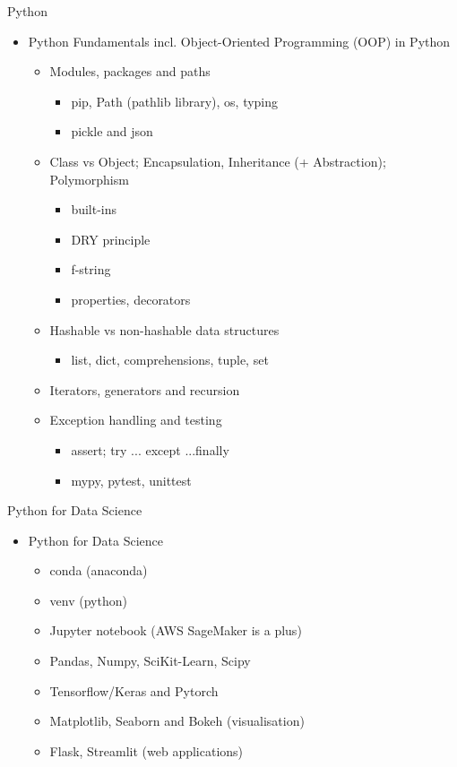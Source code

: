 \documentclass[compress,brown]{beamer}
\begin{document}
\begin{frame}{Python}
\begin{itemize}
  \item Python Fundamentals incl. Object-Oriented Programming (OOP) in Python
	\begin{itemize}
		\item Modules, packages and paths
		\begin{itemize}
			\item pip, Path (pathlib library), os, typing
			\item pickle and json
		\end{itemize} 		
		\item Class vs Object; Encapsulation, Inheritance (+ Abstraction); Polymorphism
		\begin{itemize}
			\item built-ins
			\item DRY principle
			\item f-string
			\item properties, decorators
		\end{itemize} 
		\item Hashable vs non-hashable data structures
			\begin{itemize}
				\item list, dict, comprehensions, tuple, set 
			\end{itemize}
		\item Iterators, generators and recursion
		\item Exception handling and testing
		\begin{itemize}
			\item assert; try ... except ...finally
			\item mypy, pytest, unittest
		\end{itemize}		
	\end{itemize}
\end{itemize}
\end{frame}

\begin{frame}{Python for Data Science}
\begin{itemize}
  \item Python for Data Science
\begin{itemize}
		\item conda (anaconda)
		\item venv (python)
		\item Jupyter notebook (AWS SageMaker is a plus)
		\item Pandas, Numpy, SciKit-Learn, Scipy
		\item Tensorflow/Keras and Pytorch 
		\item Matplotlib, Seaborn and Bokeh (visualisation)
		\item Flask, Streamlit (web applications)
\end{itemize}
\end{itemize}
\end{frame}
	
\end{document}
